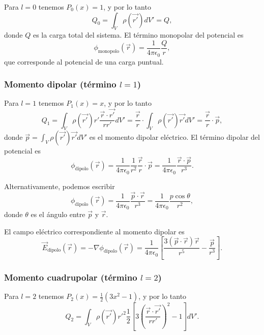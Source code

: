 \documentclass[12pt,a4paper]{book}
\begin{document}
Para $l=0$ tenemos $P_0(x) = 1$, y por lo tanto
\begin{equation}
Q_0 = \int_V \rho(\vec{r'}) dV' = Q,
\end{equation}
donde $Q$ es la carga total del sistema. El término monopolar del potencial es
\begin{equation}
\phi_{\text{monopolo}}(\vec{r}) = \frac{1}{4\pi\epsilon_0}\frac{Q}{r},
\end{equation}
que corresponde al potencial de una carga puntual.

\subsubsection{Momento dipolar (término $l=1$)}

Para $l=1$ tenemos $P_1(x) = x$, y por lo tanto
\begin{equation}
Q_1 = \int_V \rho(\vec{r'})r' \frac{\vec{r}\cdot\vec{r'}}{rr'} dV' = \frac{\vec{r}}{r}\cdot\int_V \rho(\vec{r'})\vec{r'} dV' = \frac{\vec{r}}{r}\cdot\vec{p},
\end{equation}
donde $\vec{p} = \int_V \rho(\vec{r'})\vec{r'} dV'$ es el momento dipolar eléctrico. El término dipolar del potencial es
\begin{equation}
\phi_{\text{dipolo}}(\vec{r}) = \frac{1}{4\pi\epsilon_0}\frac{1}{r^2}\frac{\vec{r}}{r}\cdot\vec{p} = \frac{1}{4\pi\epsilon_0}\frac{\vec{r}\cdot\vec{p}}{r^3}.
\end{equation}

Alternativamente, podemos escribir
\begin{equation}
\phi_{\text{dipolo}}(\vec{r}) = \frac{1}{4\pi\epsilon_0}\frac{\vec{p}\cdot\vec{r}}{r^3} = \frac{1}{4\pi\epsilon_0}\frac{p\cos\theta}{r^2},
\end{equation}
donde $\theta$ es el ángulo entre $\vec{p}$ y $\vec{r}$.

El campo eléctrico correspondiente al momento dipolar es
\begin{equation}
\vec{E}_{\text{dipolo}}(\vec{r}) = -\nabla\phi_{\text{dipolo}}(\vec{r}) = \frac{1}{4\pi\epsilon_0}\left[\frac{3(\vec{p}\cdot\vec{r})\vec{r}}{r^5} - \frac{\vec{p}}{r^3}\right].
\end{equation}

\subsubsection{Momento cuadrupolar (término $l=2$)}

Para $l=2$ tenemos $P_2(x) = \frac{1}{2}(3x^2 - 1)$, y por lo tanto
\begin{equation}
Q_2 = \int_V \rho(\vec{r'})r'^2 \frac{1}{2}\left[3\left(\frac{\vec{r}\cdot\vec{r'}}{rr'}\right)^2 - 1\right] dV'.
\end{equation}
\end{document}

